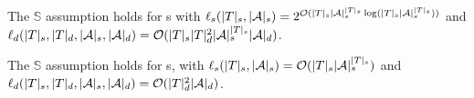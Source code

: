 \begin{lemma}\label{lem-spt}
The $\mathbb{S}$\prerec{} assumption holds for \SSPT{}s with $\ell_s(|T|_s, |\mathcal{A}|_s) = 2^{\mathcal{O}( |T|_s |\mathcal{A}|_s^{|T|_s} \log (|T|_s |\mathcal{A}|_s^{|T|_s}))}$ and  $\ell_d(|T|_s, |T|_d, |\mathcal{A}|_s, |\mathcal{A}|_d) = \mathcal{O}(|T|_s  |T|^2_d |\mathcal{A}|_s^{|T|_s} |\mathcal{A}|_d)$. 

The $\mathbb{S}$\prerec{} assumption holds for \SPT{}s, with $\ell_s(|T|_s, |\mathcal{A}|_s) =\mathcal{O}(|T|_s |\mathcal{A}|_s^{|T|_s})$ and  $\ell_d(|T|_s, |T|_d, |\mathcal{A}|_s, |\mathcal{A}|_d) = \mathcal{O}(|T|^2_d |\mathcal{A}|_d)$.
%
\end{lemma}


